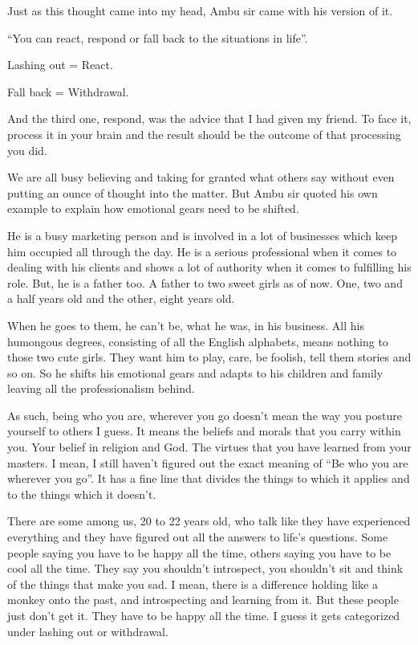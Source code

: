 \documentclass[twoside,11pt,titlepage]{article}
\begin{document}
Just as this thought came into my head, Ambu sir came with his version of it.

``You can react, respond or fall back to the situations in life''.

Lashing out = React.

Fall back = Withdrawal.

And the third one, respond, was the advice that I had given my friend. To face it, process it in your brain and the result should be the outcome of that processing you did.

We are all busy believing and taking for granted what others say without even putting an ounce of thought into the matter. But Ambu sir quoted his own example to explain how emotional gears need to be shifted.

He is a busy marketing person and is involved in a lot of businesses which keep him occupied all through the day. He is a serious professional when it comes to dealing with his clients and shows a lot of authority when it comes to fulfilling his role. But, he is a father too. A father to two sweet girls as of now. One, two and a half years old and the other, eight years old.

When he goes to them, he can't be, what he was, in his business. All his humongous degrees, consisting of all the English alphabets, means nothing to those two cute girls. They want him to play, care, be foolish, tell them stories and so on. So he shifts his emotional gears and adapts to his children and family leaving all the professionalism behind.

As such, being who you are, wherever you go doesn't mean the way you posture yourself to others I guess. It means the beliefs and morals that you carry within you. Your belief in religion and God. The virtues that you have learned from your masters. I mean, I still haven't figured out the exact meaning of ``Be who you are wherever you go''. It has a fine line that divides the things to which it applies and to the things which it doesn't.

There are some among us, 20 to 22 years old, who talk like they have experienced everything and they have figured out all the answers to life's questions. Some people saying you have to be happy all the time, others saying you have to be cool all the time. They say you shouldn't introspect, you shouldn't sit and think of the things that make you sad. I mean, there is a difference holding like a monkey onto the past, and introspecting and learning from it. But these people just don't get it. They have to be happy all the time. I guess it gets categorized under lashing out or withdrawal.
\end{document}
